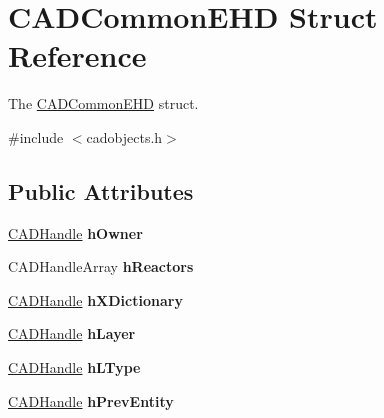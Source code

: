\hypertarget{struct_c_a_d_common_e_h_d}{}\section{C\+A\+D\+Common\+E\+HD Struct Reference}
\label{struct_c_a_d_common_e_h_d}


The \hyperlink{struct_c_a_d_common_e_h_d}{C\+A\+D\+Common\+E\+HD} struct.  




{\ttfamily \#include $<$cadobjects.\+h$>$}

\subsection*{Public Attributes}
\begin{DoxyCompactItemize}
\item 
\hyperlink{class_c_a_d_handle}{C\+A\+D\+Handle} {\bfseries h\+Owner}\hypertarget{struct_c_a_d_common_e_h_d_a0b9dcdf756bad0aff764237fe5ef5fac}{}\label{struct_c_a_d_common_e_h_d_a0b9dcdf756bad0aff764237fe5ef5fac}

\item 
C\+A\+D\+Handle\+Array {\bfseries h\+Reactors}\hypertarget{struct_c_a_d_common_e_h_d_a89af01530bd391751584cde5558ffaf5}{}\label{struct_c_a_d_common_e_h_d_a89af01530bd391751584cde5558ffaf5}

\item 
\hyperlink{class_c_a_d_handle}{C\+A\+D\+Handle} {\bfseries h\+X\+Dictionary}\hypertarget{struct_c_a_d_common_e_h_d_aeaac24d666157eae151e7f558ce3cb91}{}\label{struct_c_a_d_common_e_h_d_aeaac24d666157eae151e7f558ce3cb91}

\item 
\hyperlink{class_c_a_d_handle}{C\+A\+D\+Handle} {\bfseries h\+Layer}\hypertarget{struct_c_a_d_common_e_h_d_a722a59e32339573b60355475a4eb77c9}{}\label{struct_c_a_d_common_e_h_d_a722a59e32339573b60355475a4eb77c9}

\item 
\hyperlink{class_c_a_d_handle}{C\+A\+D\+Handle} {\bfseries h\+L\+Type}\hypertarget{struct_c_a_d_common_e_h_d_a8e322b6906d77b6e87f20e7676255aaa}{}\label{struct_c_a_d_common_e_h_d_a8e322b6906d77b6e87f20e7676255aaa}

\item 
\hyperlink{class_c_a_d_handle}{C\+A\+D\+Handle} {\bfseries h\+Prev\+Entity}\hypertarget{struct_c_a_d_common_e_h_d_a10d85f618c0428bfb8833af629f6be10}{}\label{struct_c_a_d_common_e_h_d_a10d85f618c0428bfb8833af629f6be10}


\end{DoxyCompactItemize}
